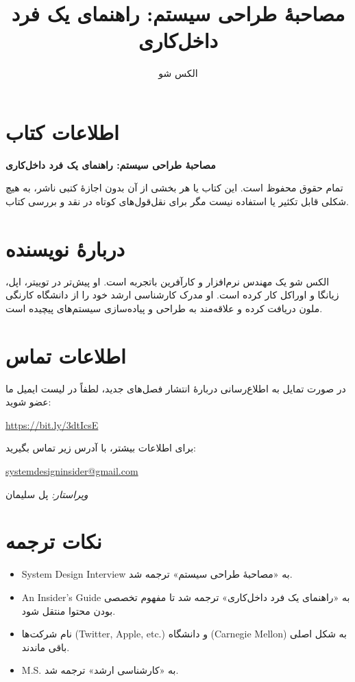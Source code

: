 \documentclass[12pt,a4paper]{article}
\title{مصاحبهٔ طراحی سیستم: راهنمای یک فرد داخل‌کاری}
\author{الکس شو}
\date{}
\begin{document}
\maketitle

\begin{Arabic}

\section*{اطلاعات کتاب}

\textbf{مصاحبهٔ طراحی سیستم: راهنمای یک فرد داخل‌کاری}

تمام حقوق محفوظ است. این کتاب یا هر بخشی از آن بدون اجازهٔ کتبی ناشر، به هیچ شکلی قابل تکثیر یا استفاده نیست مگر برای نقل‌قول‌های کوتاه در نقد و بررسی کتاب.

\section*{دربارهٔ نویسنده}

الکس شو یک مهندس نرم‌افزار و کارآفرین باتجربه است. او پیش‌تر در توییتر، اپل، زیانگا و اوراکل کار کرده است. او مدرک کارشناسی ارشد خود را از دانشگاه کارنگی ملون دریافت کرده و علاقه‌مند به طراحی و پیاده‌سازی سیستم‌های پیچیده است.

\section*{اطلاعات تماس}

در صورت تمایل به اطلاع‌رسانی دربارهٔ انتشار فصل‌های جدید، لطفاً در لیست ایمیل ما عضو شوید:

\end{Arabic}

\url{https://bit.ly/3dtIcsE}

\begin{Arabic}

برای اطلاعات بیشتر، با آدرس زیر تماس بگیرید:

\end{Arabic}

\href{mailto:systemdesigninsider@gmail.com}{systemdesigninsider@gmail.com}

\begin{Arabic}

\textit{ویراستار:} پل سلیمان

\section*{نکات ترجمه}

\begin{itemize}
\item System Design Interview به «مصاحبهٔ طراحی سیستم» ترجمه شد.
\item An Insider's Guide به «راهنمای یک فرد داخل‌کاری» ترجمه شد تا مفهوم تخصصی بودن محتوا منتقل شود.
\item نام شرکت‌ها (Twitter, Apple, etc.) و دانشگاه (Carnegie Mellon) به شکل اصلی باقی ماندند.
\item M.S. به «کارشناسی ارشد» ترجمه شد.
\end{itemize}

\end{Arabic}
\end{document}
